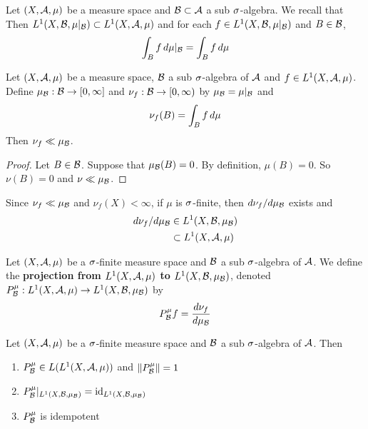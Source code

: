 \documentclass{book}
\begin{document}
	\begin{note}
		Let $(X, \mathcal{A}, \mu)$ be a measure space and $\mathcal{B} \subset \mathcal{A}$ a sub $\sigma$-algebra. We recall  that  Then $ L^1(X, \mathcal{B}, \mu|_{\mathcal{B}}) \subset L^1(X, \mathcal{A}, \mu)$ and for each $f \in L^1(X, \mathcal{B}, \mu|_{\mathcal{B}})$ and $B \in \mathcal{B}$, 
		$$\int_B f \, d \mu|_{\mathcal{B}} = \int_B f \, d \mu$$
	\end{note}
	
	\begin{ex}
		Let $(X, \mathcal{A}, \mu)$ be a measure space, $\mathcal{B}$ a sub $\sigma$-algebra of $\mathcal{A}$ and $f \in L^1(X, \mathcal{A}, \mu)$. Define $\mu_{\mathcal{B}}: \mathcal{B} \rightarrow [0, \infty] $ and $\nu_f: \mathcal{B} \rightarrow [0,\infty)$ by $\mu_{\mathcal{B}} = \mu|_{\mathcal{B}}$ and 
		$$\nu_f(B) = \int_B f \, d \mu $$ Then $\nu_f \ll \mu_{\mathcal{B}}$. 
	\end{ex}	
	
	\begin{proof}
		Let $B \in \mathcal{B}$. Suppose that $\mu_{\mathcal{B}}(B) = 0$. By definition, $\mu(B) = 0$. So $\nu(B) = 0$ and $\nu \ll \mu_{\mathcal{B}}$.
	\end{proof}
	
	\begin{note}
		Since $\nu_f \ll \mu_{\mathcal{B}}$ and $\nu_f(X) < \infty$, if $\mu$ is $\sigma$-finite, then $d \nu_{f} / d \mu_{\mathcal{B}}$ exists and 
		\begin{align*}
			d \nu_{f} / d \mu_{\mathcal{B}} 
			& \in L^1(X, \mathcal{B}, \mu_{\mathcal{B}}) \\
			& \subset L^1(X, \mathcal{A}, \mu)
		\end{align*}
	\end{note}
	
	\begin{defn}
		Let $(X, \mathcal{A}, \mu)$ be a $\sigma$-finite measure space and $\mathcal{B}$ a sub $\sigma$-algebra of $\mathcal{A}$. We define the \textbf{projection from $L^1(X, \mathcal{A}, \mu)$ to $L^1(X, \mathcal{B}, \mu_{\mathcal{B}})$}, denoted $P^{\mu}_{\mathcal{B}}:L^1(X, \mathcal{A}, \mu) \rightarrow L^1(X, \mathcal{B}, \mu_{\mathcal{B}})$ by 
		$$P^{\mu}_{\mathcal{B}}f = \frac{d \nu_f}{d \mu_{\mathcal{B}}}$$ 
	\end{defn}
	
	\begin{ex}
		Let $(X, \mathcal{A}, \mu)$ be a $\sigma$-finite measure space and $\mathcal{B}$ a sub $\sigma$-algebra of $\mathcal{A}$. Then 
		\begin{enumerate}
			\item $P^{\mu}_{\mathcal{B}} \in L(L^1(X, \mathcal{A}, \mu))$ and $\|P^{\mu}_{\mathcal{B}}\| = 1$
			\item $P^{\mu}_{\mathcal{B}}|_{L^1(X, \mathcal{B}, \mu_{\mathcal{B}})} = \operatorname{id}_{L^1(X, \mathcal{B}, \mu_{\mathcal{B}})}$ 
			\item $P^{\mu}_{\mathcal{B}}$ is idempotent
		\end{enumerate}
	\end{ex}
	
\end{document}
